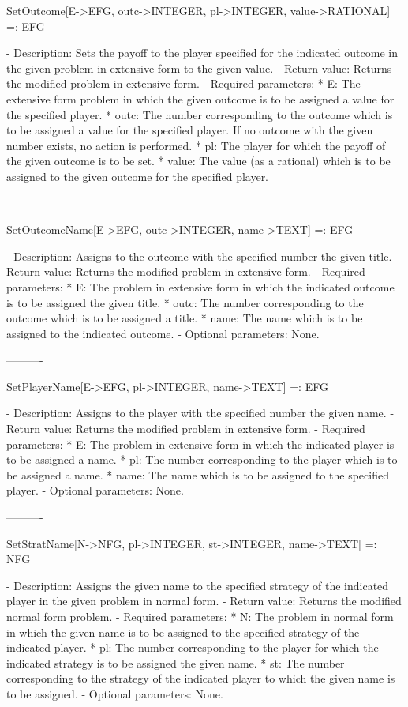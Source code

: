 \begin{itemize}
SetOutcome[E->EFG, outc->INTEGER, pl->INTEGER, value->RATIONAL] =: EFG

   -	Description:  Sets the payoff to the player specified for the indicated
	outcome in the given problem in extensive form to the given value.
   -	Return value:  Returns the modified problem in extensive form.
   -	Required parameters:
	  *  E:  The extensive form problem in which the given outcome is to be
		assigned a value for the specified player.
	  *  outc:  The number corresponding to the outcome which is to be 
		assigned a value for the specified player.  If no outcome with
		 the given number exists, no action is performed.
	  *  pl:  The player for which the payoff of the given outcome is to be
		set.
	  *  value:  The value (as a rational) which is to be assigned to the 
		given outcome for the specified player.

----------

SetOutcomeName[E->EFG, outc->INTEGER, name->TEXT] =: EFG

   -	Description:  Assigns to the outcome with the specified number the 
	given title.
   -	Return value:  Returns the modified problem in extensive form.
   -	Required parameters:
	  *  E:  The problem in extensive form in which the indicated outcome 
		is to be assigned the given title.
	  *  outc:  The number corresponding to the outcome which is to be 
		assigned a title.
	  *  name:  The name which is to be assigned to the indicated outcome.
   -	Optional parameters:  None.

----------

SetPlayerName[E->EFG, pl->INTEGER, name->TEXT] =: EFG

   -	Description:  Assigns to the player with the specified number the given
	name.
   -	Return value:  Returns the modified problem in extensive form.
   -	Required parameters:
	  *  E:  The problem in extensive form in which the indicated player is
		to be assigned a name.
	  *  pl:  The number corresponding to the player which is to be 
		assigned a name.
	  *  name:  The name which is to be assigned to the specified player.
   -	Optional parameters:  None.

----------

SetStratName[N->NFG, pl->INTEGER, st->INTEGER, name->TEXT] =: NFG

   -	Description:  Assigns the given name to the specified strategy of the
	indicated player in the given problem in normal form.
   -	Return value:  Returns the modified normal form problem.
   -	Required parameters:
	  *  N:  The problem in normal form in which the given name is to be
		assigned to the specified strategy of the indicated player.
	  *  pl:  The number corresponding to the player for which the 
		indicated strategy is to be assigned the given name.
	  *  st:  The number corresponding to the strategy of the indicated 
		player to which the given name is to be assigned.
   -	Optional parameters:  None.


\end{itemize}
